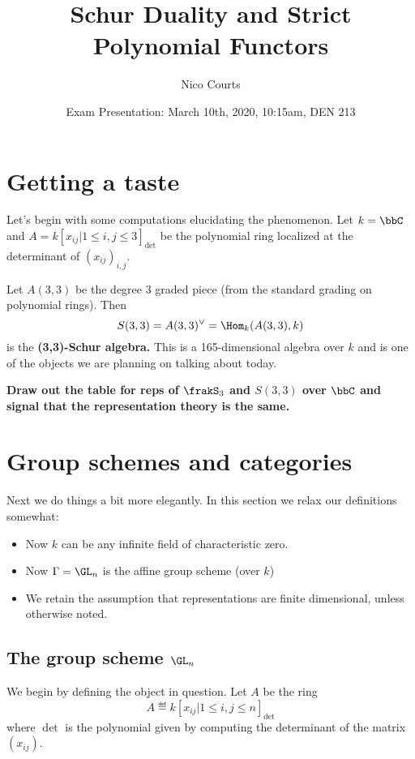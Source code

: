 \documentclass[12pt]{article}
\begin{document}
\title{Schur Duality and Strict Polynomial Functors}
\author{Nico Courts}
\date{Exam Presentation: March 10th, 2020, 10:15am, DEN 213}
\maketitle

\setcounter{tocdepth}{2}
\tableofcontents

\newpage

\section{Getting a taste}
Let's begin with some computations elucidating the phenomenon. Let $k=\bbC$ and $A=k[x_{ij}|1\le i,j\le 3]_{\det}$ be the polynomial ring localized 
at the determinant of $(x_{ij})_{i,j}$. 

Let $A(3,3)$ be the degree $3$ graded piece (from the standard grading on polynomial rings). Then 
\[S(3,3)=A(3,3)^\vee=\Hom_k(A(3,3),k)\]
is the \textbf{(3,3)-Schur algebra.} This is a 165-dimensional algebra over $k$ and is one of the objects we are 
planning on talking about today.

\textbf{Draw out the table for reps of $\frakS_3$ and $S(3,3)$ over $\bbC$ and signal that the representation theory is the same.}
\newpage


\section{Group schemes and categories}
	Next we do things a bit more elegantly. In this section we relax our definitions somewhat:
	\begin{itemize}
		\item Now $k$ can be any infinite field of characteristic zero.
		\item Now $\Gamma=\GL_n$ is the affine group scheme (over $k$)
		\item We retain the assumption that representations are finite dimensional, unless otherwise noted.
	\end{itemize}
	\subsection{The group scheme \texorpdfstring{$\GL_n$}{GLn}}
	We begin by defining the object in question. Let $A$ be the ring 
	\[A\eqdef k[x_{ij}|1\le i,j\le n]_{\det}\]
	where $\det$ is the polynomial given by computing the determinant of the matrix $(x_{ij})$.
\end{document}
